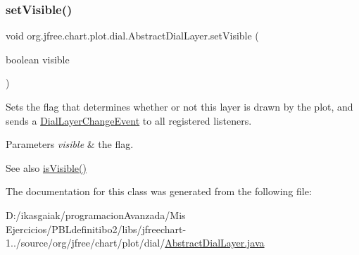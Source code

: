 \mbox{\label{classorg_1_1jfree_1_1chart_1_1plot_1_1dial_1_1_abstract_dial_layer_adb2e0eb36094ed7735624cc8e0060710}} 
\subsubsection{\texorpdfstring{set\+Visible()}{setVisible()}}
{\footnotesize\ttfamily void org.\+jfree.\+chart.\+plot.\+dial.\+Abstract\+Dial\+Layer.\+set\+Visible (\begin{DoxyParamCaption}\item[{boolean}]{visible }\end{DoxyParamCaption})}

Sets the flag that determines whether or not this layer is drawn by the plot, and sends a \mbox{\hyperlink{classorg_1_1jfree_1_1chart_1_1plot_1_1dial_1_1_dial_layer_change_event}{Dial\+Layer\+Change\+Event}} to all registered listeners.


\begin{DoxyParams}{Parameters}
{\em visible} & the flag.\\
\hline
\end{DoxyParams}
\begin{DoxySeeAlso}{See also}
\mbox{\hyperlink{classorg_1_1jfree_1_1chart_1_1plot_1_1dial_1_1_abstract_dial_layer_a0e4e9aff1a280718d2018d9e94c28027}{is\+Visible()}} 
\end{DoxySeeAlso}


The documentation for this class was generated from the following file\+:\begin{DoxyCompactItemize}
\item 
D\+:/ikasgaiak/programacion\+Avanzada/\+Mis Ejercicios/\+P\+B\+Ldefinitibo2/libs/jfreechart-\/1../source/org/jfree/chart/plot/dial/\mbox{\hyperlink{_abstract_dial_layer_8java}{Abstract\+Dial\+Layer.\+java}}\end{DoxyCompactItemize}
